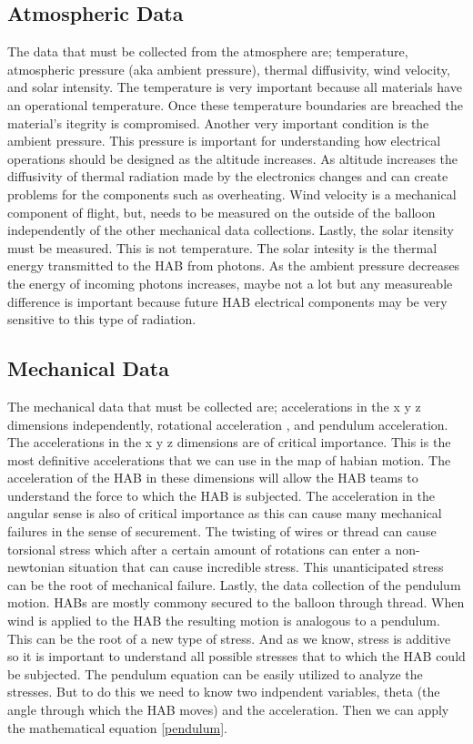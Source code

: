 \documentclass[journal]{SPEXformat}
\begin{document}
\subsection{Atmospheric Data}
\label{subsec:atmospheric data}
  The data that must be collected from the atmosphere are; temperature, atmospheric pressure (aka ambient pressure),
  thermal diffusivity, wind velocity, and solar intensity. The temperature is very important because all materials have
  an operational temperature. Once these temperature boundaries are breached the material's itegrity is
  compromised. Another very important condition is the ambient pressure. This pressure is important for understanding
  how electrical operations should be designed as the altitude increases. As altitude increases the diffusivity of
  thermal radiation made by the electronics changes and can create problems for the components such as overheating.
  Wind velocity is a mechanical component of flight, but, needs to be measured on the outside of the balloon independently
  of the other mechanical data collections. Lastly, the solar itensity must be measured. This is not temperature.
  The solar intesity is the thermal energy transmitted to the HAB from photons. As the ambient pressure decreases
  the energy of incoming photons increases, maybe not a lot but any measureable difference is important because future
  HAB electrical components may be very sensitive to this type of radiation.

\subsection{Mechanical Data}
\label{subsec:mechanical data}
  The mechanical data that must be collected are; accelerations in the x y z dimensions independently, rotational acceleration
  , and pendulum acceleration. The accelerations in the x y z dimensions are of critical importance. This is the most
  definitive accelerations that we can use in the map of habian motion. The acceleration of the HAB in these dimensions
  will allow the HAB teams to understand the force to which the HAB is subjected. The acceleration in the angular sense
  is also of critical importance as this can cause many mechanical failures in the sense of securement. The twisting of
  wires or thread can cause torsional stress which after a certain amount of rotations can enter a non-newtonian situation
  that can cause incredible stress. This unanticipated stress can be the root of mechanical failure. Lastly, the data
  collection of the pendulum motion. HABs are mostly commony secured to the balloon through thread. When wind is applied
  to the HAB the resulting motion is analogous to a pendulum. This can be the root of a new type of stress. And as we know,
  stress is additive so it is important to understand all possible stresses that to which the HAB could be subjected. The
  pendulum equation can be easily utilized to analyze the stresses. But to do this we need to know two indpendent variables,
  theta (the angle through which the HAB moves) and the acceleration. Then we can apply the mathematical equation \ref{pendulum}.
\end{document}
